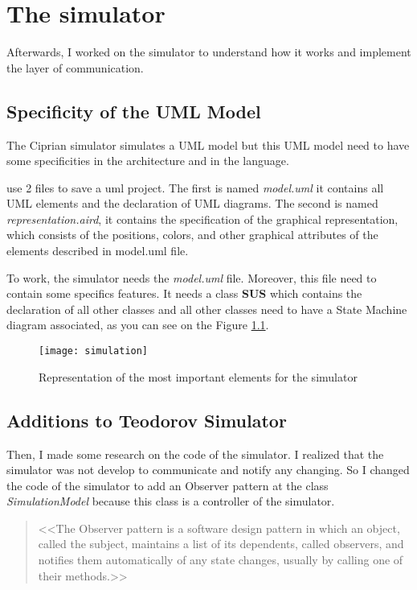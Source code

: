 
\chapter{The simulator}
\label{chap:simul}

Afterwards, I worked on the simulator to understand how it works and implement the layer of communication.

\section{Specificity of the UML Model}

The Ciprian simulator simulates a UML model but this UML model need to have some specificities in the architecture and in the language.

\umld use 2 files to save a uml project. The first is named \textit{model.uml} it contains all UML elements and the declaration of UML diagrams. The second is named \textit{representation.aird}, it contains the specification of the graphical representation, which consists of the positions, colors, and other graphical attributes of the elements described in model.uml file.

To work, the simulator needs the \textit{model.uml} file. Moreover, this file need to contain some specifics features. It needs a class \textbf{SUS} which contains the declaration of all other classes and all other classes need to have a State Machine diagram associated, as you can see on the Figure \ref{fig:simulateur}.

\begin{figure}[h!]
  \centering
  \texttt{[image: simulation]}
  \caption{Representation of the most important elements for the simulator}
  \label{fig:simulateur}
\end{figure}

\section{Additions to Teodorov Simulator}

Then, I made some research on the code of the simulator. I realized that the simulator was not develop to communicate and notify any changing. So I changed the code of the simulator to add an Observer pattern at the class \textit{SimulationModel} because this class is a controller of the simulator.

\begin{quotation}
<<The Observer pattern is a software design pattern in which an object, called the subject, maintains a list of its dependents, called observers, and notifies them automatically of any state changes, usually by calling one of their methods.>> \cite{wiki_pattern}
\end{quotation}


